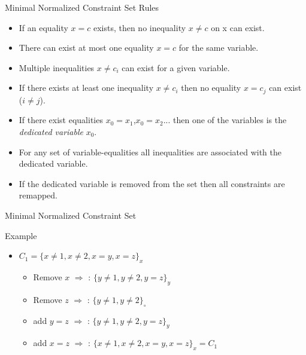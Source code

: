 \begin{frame}{Minimal Normalized Constraint Set Rules}
\begin{itemize}
\item If an equality $x=c$ exists, then no inequality $x\neq c$ on x can exist.
\item There can exist at most one equality $x=c$ for the same variable.
\item Multiple inequalities $x \neq c_i$ can exist for a given variable.
\item If there exists at least one inequality $x\neq c_i$ then no equality $x=c_j$ can exist ($i\neq j$).
\item If there exist equalities $x_0=x_1$,$x_0=x_2$$...$ then one of the variables is the {\em dedicated variable} $x_0$.
\item For any set of variable-equalities all inequalities are associated with the dedicated variable.
\item If the dedicated variable is removed from the set then all constraints are remapped.
\end{itemize}
\end{frame}

\begin{frame}{Minimal Normalized Constraint Set}

\begin{block}{Example}

\begin{itemize}
\item $C_1=\{x\neq 1, x\neq 2, x=y, x=z\}_x$ 
\begin{itemize}
\item Remove $x$ $\Rightarrow$ : $\{y\neq 1, y\neq 2, y=z\}_y$
\item Remove $z$ $\Rightarrow$ : $\{y\neq 1, y\neq 2\}_{\circ}$
\item add $y=z$ $\Rightarrow$ : $\{y\neq 1, y\neq 2, y=z\}_y$
\item add $x=z$ $\Rightarrow$ : $\{x\neq 1, x\neq 2, x=y, x=z\}_x=C_1$
\end{itemize}
\end{itemize}

\end{block}

\end{frame}

